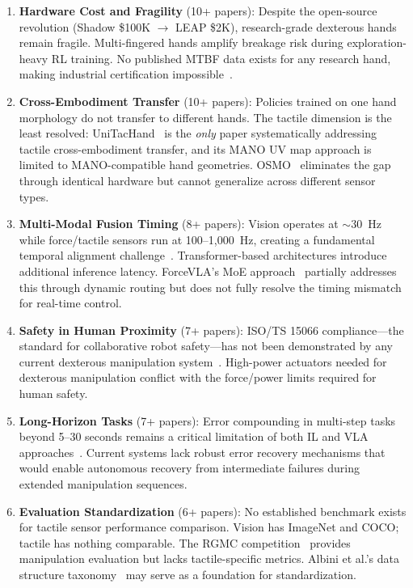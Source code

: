 \begin{enumerate}
    \item \textbf{Hardware Cost and Fragility} (10+ papers): Despite the open-source revolution (Shadow \$100K $\to$ LEAP \$2K), research-grade dexterous hands remain fragile. Multi-fingered hands amplify breakage risk during exploration-heavy RL training. No published MTBF data exists for any research hand, making industrial certification impossible~\cite{shaw2023leap}.

    \item \textbf{Cross-Embodiment Transfer} (10+ papers): Policies trained on one hand morphology do not transfer to different hands. The tactile dimension is the least resolved: UniTacHand~\cite{zhang2025unitachand} is the \emph{only} paper systematically addressing tactile cross-embodiment transfer, and its MANO UV map approach is limited to MANO-compatible hand geometries. OSMO~\cite{yin2025osmo} eliminates the gap through identical hardware but cannot generalize across different sensor types.

    \item \textbf{Multi-Modal Fusion Timing} (8+ papers): Vision operates at $\sim$30~Hz while force/tactile sensors run at 100--1{,}000~Hz, creating a fundamental temporal alignment challenge~\cite{yu2025forcevla,suresh2024neuralfeels}. Transformer-based architectures introduce additional inference latency. ForceVLA's MoE approach~\cite{yu2025forcevla} partially addresses this through dynamic routing but does not fully resolve the timing mismatch for real-time control.

    \item \textbf{Safety in Human Proximity} (7+ papers): ISO/TS 15066 compliance---the standard for collaborative robot safety---has not been demonstrated by any current dexterous manipulation system~\cite{billard2019trends}. High-power actuators needed for dexterous manipulation conflict with the force/power limits required for human safety.

    \item \textbf{Long-Horizon Tasks} (7+ papers): Error compounding in multi-step tasks beyond 5--30 seconds remains a critical limitation of both IL and VLA approaches~\cite{black2024pi0,google2025gemini}. Current systems lack robust error recovery mechanisms that would enable autonomous recovery from intermediate failures during extended manipulation sequences.

    \item \textbf{Evaluation Standardization} (6+ papers): No established benchmark exists for tactile sensor performance comparison. Vision has ImageNet and COCO; tactile has nothing comparable. The RGMC competition~\cite{yu2025rgmc} provides manipulation evaluation but lacks tactile-specific metrics. Albini et al.'s data structure taxonomy~\cite{albini2025representing} may serve as a foundation for standardization.
\end{enumerate}

